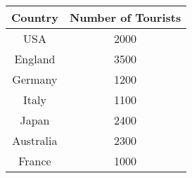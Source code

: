 \begin{tabular}{ | c| c| }

     \hline
     Country & Number of Tourists\\
     \hline
     USA & 2000 \\
    \hline
     England & 3500\\
    \hline
     Germany & 1200\\
    \hline
     Italy & 1100\\
    \hline
     Japan & 2400\\
     \hline
     Australia & 2300\\
      \hline
     France & 1000\\
     \hline
\end{tabular}

